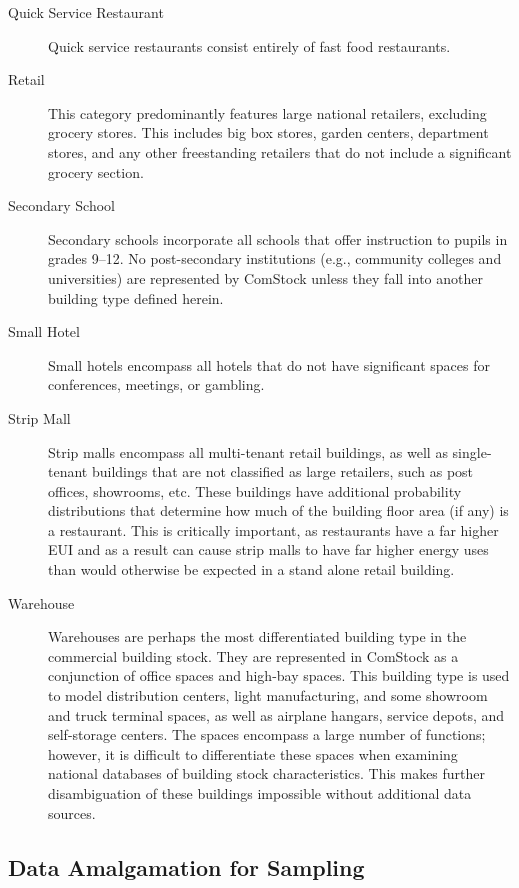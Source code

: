 \begin{description}
\item[Quick Service Restaurant] Quick service restaurants consist entirely of fast food restaurants.
\item[Retail] This category predominantly features large national retailers, excluding grocery stores. This includes big box stores, garden centers, department stores, and any other freestanding retailers that do not include a significant grocery section.
\item[Secondary School] Secondary schools incorporate all schools that offer instruction to pupils in grades 9--12. No post-secondary institutions (e.g., community colleges and universities) are represented by ComStock unless they fall into another building type defined herein.
\item[Small Hotel] Small hotels encompass all hotels that do not have significant spaces for conferences, meetings, or gambling.
\item[Strip Mall] Strip malls encompass all multi-tenant retail buildings, as well as single-tenant buildings that are not classified as large retailers, such as post offices, showrooms, etc. These buildings have additional probability distributions that determine how much of the building floor area (if any) is a restaurant. This is critically important, as restaurants have a far higher EUI and as a result can cause strip malls to have far higher energy uses than would otherwise be expected in a stand alone retail building.
\item[Warehouse] Warehouses are perhaps the most differentiated building type in the commercial building stock. They are represented in ComStock as a conjunction of office spaces and high-bay spaces. This building type is used to model distribution centers, light manufacturing, and some showroom and truck terminal spaces, as well as airplane hangars, service depots, and self-storage centers. The spaces encompass a large number of functions; however, it is difficult to differentiate these spaces when examining national databases of building stock characteristics. This makes further disambiguation of these buildings impossible without additional data sources.
\end{description}

\subsection{Data Amalgamation for Sampling} \label{sec:3.1.3data amalgamation for sampling}

